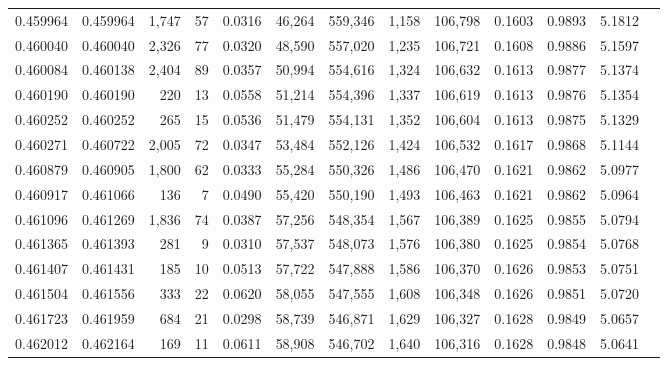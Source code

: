 \begin{tabular}{rrrrrrrrrrrrr}
0.459964 & 0.459964 & 1,747 &    57 &                                     0.0316 &  46,264 & 559,346 &   1,158 & 106,798 & 0.1603 & 0.9893 & 5.1812 \\
0.460040 & 0.460040 & 2,326 &    77 &                                     0.0320 &  48,590 & 557,020 &   1,235 & 106,721 & 0.1608 & 0.9886 & 5.1597 \\
0.460084 & 0.460138 & 2,404 &    89 &                                     0.0357 &  50,994 & 554,616 &   1,324 & 106,632 & 0.1613 & 0.9877 & 5.1374 \\
0.460190 & 0.460190 &   220 &    13 &                                     0.0558 &  51,214 & 554,396 &   1,337 & 106,619 & 0.1613 & 0.9876 & 5.1354 \\
0.460252 & 0.460252 &   265 &    15 &                                     0.0536 &  51,479 & 554,131 &   1,352 & 106,604 & 0.1613 & 0.9875 & 5.1329 \\
0.460271 & 0.460722 & 2,005 &    72 &                                     0.0347 &  53,484 & 552,126 &   1,424 & 106,532 & 0.1617 & 0.9868 & 5.1144 \\
0.460879 & 0.460905 & 1,800 &    62 &                                     0.0333 &  55,284 & 550,326 &   1,486 & 106,470 & 0.1621 & 0.9862 & 5.0977 \\
0.460917 & 0.461066 &   136 &     7 &                                     0.0490 &  55,420 & 550,190 &   1,493 & 106,463 & 0.1621 & 0.9862 & 5.0964 \\
0.461096 & 0.461269 & 1,836 &    74 &                                     0.0387 &  57,256 & 548,354 &   1,567 & 106,389 & 0.1625 & 0.9855 & 5.0794 \\
0.461365 & 0.461393 &   281 &     9 &                                     0.0310 &  57,537 & 548,073 &   1,576 & 106,380 & 0.1625 & 0.9854 & 5.0768 \\
0.461407 & 0.461431 &   185 &    10 &                                     0.0513 &  57,722 & 547,888 &   1,586 & 106,370 & 0.1626 & 0.9853 & 5.0751 \\
0.461504 & 0.461556 &   333 &    22 &                                     0.0620 &  58,055 & 547,555 &   1,608 & 106,348 & 0.1626 & 0.9851 & 5.0720 \\
0.461723 & 0.461959 &   684 &    21 &                                     0.0298 &  58,739 & 546,871 &   1,629 & 106,327 & 0.1628 & 0.9849 & 5.0657 \\
0.462012 & 0.462164 &   169 &    11 &                                     0.0611 &  58,908 & 546,702 &   1,640 & 106,316 & 0.1628 & 0.9848 & 5.0641 \\

\end{tabular}
